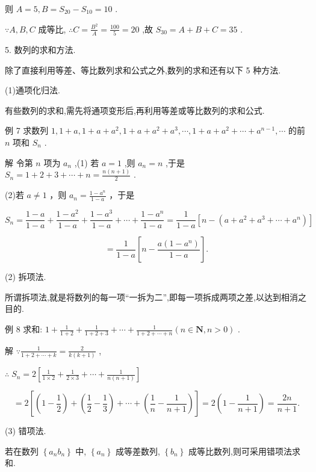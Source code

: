 \documentclass[10pt]{article}
\begin{document}
则 \(A = 5,B = {S}_{20} - {S}_{10} = {10}\) .

\(\because A,B,C\) 成等比, \(\therefore C = \frac{{B}^{2}}{A} = \frac{100}{5} = {20}\) ,故 \({S}_{30} = A + B + C = {35}\) .

5. 数列的求和方法.

除了直接利用等差、等比数列求和公式之外,数列的求和还有以下 5 种方法.

(1)通项化归法.

有些数列的求和,需先将通项变形后,再利用等差或等比数列的求和公式.

例 7 求数列 \(1,1 + a,1 + a + {a}^{2},1 + a + {a}^{2} + {a}^{3},\cdots ,1 + a + {a}^{2} + \cdots  + {a}^{n - 1},\cdots\) 的前 \(n\) 项和 \({S}_{n}\) .

解 令第 \(n\) 项为 \({a}_{n}\) ,(1) 若 \(a = 1\) ,则 \({a}_{n} = n\) ,于是 \({S}_{n} = 1 + 2 + 3 + \cdots  + n = \frac{n\left( {n + 1}\right) }{2}\) .

(2)若 \(a \neq  1\) ，则 \({a}_{n} = \frac{1 - {a}^{n}}{1 - a}\) ，于是

\[
{S}_{n} = \frac{1 - a}{1 - a} + \frac{1 - {a}^{2}}{1 - a} + \frac{1 - {a}^{3}}{1 - a} + \cdots  + \frac{1 - {a}^{n}}{1 - a} = \frac{1}{1 - a}\left\lbrack  {n - \left( {a + {a}^{2} + {a}^{3} + \cdots  + {a}^{n}}\right) }\right\rbrack
\]

\[
= \frac{1}{1 - a}\left\lbrack  {n - \frac{a\left( {1 - {a}^{n}}\right) }{1 - a}}\right\rbrack  .
\]

(2) 拆项法.

所谓拆项法,就是将数列的每一项“一拆为二”,即每一项拆成两项之差,以达到相消之目的.

例 8 求和: \(1 + \frac{1}{1 + 2} + \frac{1}{1 + 2 + 3} + \cdots  + \frac{1}{1 + 2 + \cdots  + n}\left( {n \in  \mathbf{N},n > 0}\right)\) .

解 \(\because \frac{1}{1 + 2 + \cdots  + k} = \frac{2}{k\left( {k + 1}\right) }\) ,

\(\therefore \;{S}_{n} = 2\left\lbrack  {\frac{1}{1 \times  2} + \frac{1}{2 \times  3} + \cdots  + \frac{1}{n\left( {n + 1}\right) }}\right\rbrack\)

\[
= 2\left\lbrack  {\left( {1 - \frac{1}{2}}\right)  + \left( {\frac{1}{2} - \frac{1}{3}}\right)  + \cdots  + \left( {\frac{1}{n} - \frac{1}{n + 1}}\right) }\right\rbrack   = 2\left( {1 - \frac{1}{n + 1}}\right)  = \frac{2n}{n + 1}.
\]

(3) 错项法.

若在数列 \(\left\{  {{a}_{n}{b}_{n}}\right\}\) 中, \(\left\{  {a}_{n}\right\}\) 成等差数列, \(\left\{  {b}_{n}\right\}\) 成等比数列,则可采用错项法求和.
\end{document}
